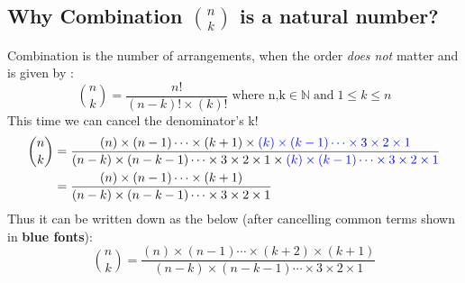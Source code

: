 \documentclass[10pt, twoside]{article}
\newcommand*{\Combination}[2]{\binom{#1}{#2}}%
\begin{document}
 	\subsection{Why Combination $\Combination{n}{k}$ is a natural number?}
 	Combination is the number of arrangements, when the order \textit{does not} matter and is given by \cite{PrincTechCombinatorics}:\newline
 	\begin{equation}
 		\Combination{n}{k} = \frac{n!}{(n-k)!\times(k)!} \; \text{where n,k} \in \mathbb{N} \; \text{and} \; 1 \leq k \leq n
 	\end{equation}
 	This time we can cancel the denominator's k!
 	\begin{align*}
 		\Combination{n}{k} &= \frac{(n)\times(n-1)\cdots\times(k+1)\times\color{blue}(k)\times(k-1)\cdots\times3\times2\times1}{(n-k)\times(n-k-1)\cdots\times3\times2\times1\times\color{blue}(k)\times(k-1)\cdots\times3\times2\times1}\\
 		&= \frac{(n)\times(n-1)\cdots\times(k+1)}{(n-k)\times(n-k-1)\cdots\times3\times2\times1}
 	\end{align*}
 Thus it can be written down as the below (after cancelling common terms shown in \textbf{\color{blue}blue fonts}):
 \begin{equation}
 	\Combination{n}{k} = \frac{(n)\times(n-1)\cdots\times(k+2)\times(k+1)}{(n-k)\times(n-k-1)\cdots\times3\times2\times1} \label{reducedCombinationForm}
 \end{equation}
\end{document}
